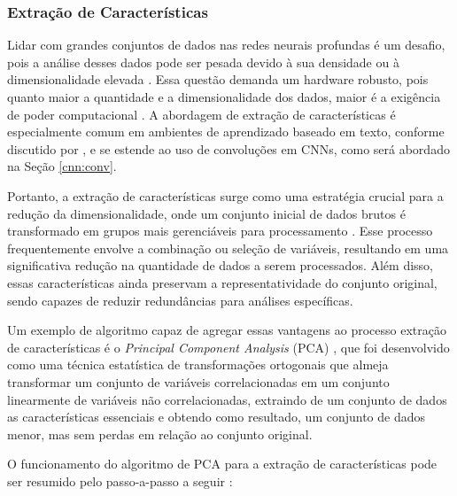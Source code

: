 \subsubsection{Extração de Características}
\label{project:feature_extraction}

Lidar com grandes conjuntos de dados nas redes neurais profundas é um desafio, pois a análise desses dados pode ser pesada devido à sua densidade ou à dimensionalidade elevada \citep{Liang2017TextReview}. Essa questão demanda um hardware robusto, pois quanto maior a quantidade e a dimensionalidade dos dados, maior é a exigência de poder computacional \citep{Benyahia2022Multi-featuresClassification}. A abordagem de extração de características é especialmente comum em ambientes de aprendizado baseado em texto, conforme discutido por \cite{Liang2017TextReview}, e se estende ao uso de convoluções em CNNs, como será abordado na Seção \ref{cnn:conv}.

Portanto, a extração de características surge como uma estratégia crucial para a redução da dimensionalidade, onde um conjunto inicial de dados brutos é transformado em grupos mais gerenciáveis para processamento \citep{Benyahia2022Multi-featuresClassification}. Esse processo frequentemente envolve a combinação ou seleção de variáveis, resultando em uma significativa redução na quantidade de dados a serem processados. Além disso, essas características ainda preservam a representatividade do conjunto original, sendo capazes de reduzir redundâncias para análises específicas.

Um exemplo de algoritmo capaz de agregar essas vantagens ao processo extração de características é o \textit{Principal Component Analysis} (PCA) \citep{pearson1901liii}, que foi desenvolvido como uma técnica estatística de transformações ortogonais que almeja transformar um conjunto de variáveis correlacionadas em um conjunto linearmente de variáveis não correlacionadas, extraindo de um conjunto de dados as características essenciais \citep{pearson1901liii, Wold1987PrincipalAnalysis} e obtendo como resultado, um conjunto de dados menor, mas sem perdas em relação ao conjunto original.

O funcionamento do algoritmo de PCA para a extração de características pode ser resumido pelo passo-a-passo a seguir \citep{Song2010FeatureAnalysis}:

